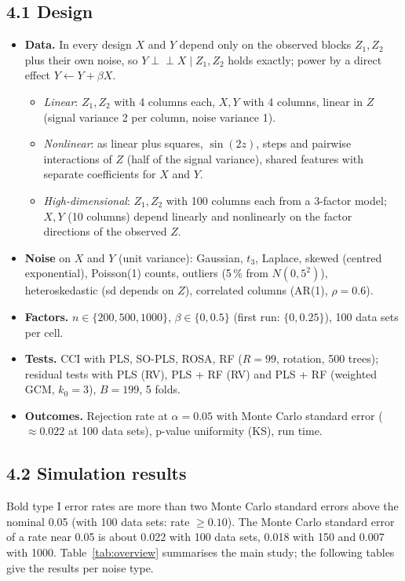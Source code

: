 \documentclass[10pt,leqno]{amsart}
\newcommand{\ci}{\perp\!\!\!\perp}          %
\begin{document}
\subsection*{4.1 Design}
\begin{itemize}
\item \textbf{Data.} In every design $X$ and $Y$ depend only on the observed blocks
  $Z_1,Z_2$ plus their own noise, so $Y\ci X\mid Z_1,Z_2$ holds exactly; power by a
  direct effect $Y\leftarrow Y+\beta X$.
  \begin{itemize}
  \item \emph{Linear}: $Z_1,Z_2$ with 4 columns each, $X,Y$ with 4 columns, linear in $Z$
    (signal variance 2 per column, noise variance 1).
  \item \emph{Nonlinear}: as linear plus squares, $\sin(2z)$, steps and pairwise
    interactions of $Z$ (half of the signal variance), shared features with
    separate coefficients for $X$ and $Y$.
  \item \emph{High-dimensional}: $Z_1,Z_2$ with 100 columns each from a 3-factor
    model; $X,Y$ (10 columns) depend linearly and nonlinearly on the factor
    directions of the observed $Z$.
  \end{itemize}
\item \textbf{Noise} on $X$ and $Y$ (unit variance): Gaussian, $t_3$, Laplace, skewed
  (centred exponential), Poisson(1) counts, outliers (5\,\% from $N(0,5^2)$),
  heteroskedastic (sd depends on $Z$), correlated columns (AR(1), $\rho=0.6$).
\item \textbf{Factors.} $n\in\{200,500,1000\}$, $\beta\in\{0,0.5\}$ (first run:
  $\{0,0.25\}$), 100 data sets per cell.
\item \textbf{Tests.} CCI with PLS, SO-PLS, ROSA, RF ($R=99$, rotation, 500 trees);
  residual tests with PLS (RV), PLS + RF (RV) and PLS + RF (weighted GCM, $k_0=3$),
  $B=199$, 5 folds.
\item \textbf{Outcomes.} Rejection rate at $\alpha=0.05$ with Monte Carlo standard
  error ($\approx 0.022$ at 100 data sets), p-value uniformity (KS), run time.
\end{itemize}

\subsection*{4.2 Simulation results}

Bold type I error rates are more than two Monte Carlo standard errors above the
nominal 0.05 (with 100 data sets: rate $\ge 0.10$). The Monte Carlo standard error of
a rate near 0.05 is about 0.022 with 100 data sets, 0.018 with 150 and 0.007 with
1000. Table~\ref{tab:overview} summarises the main study; the following tables give
the results per noise type.
\end{document}
